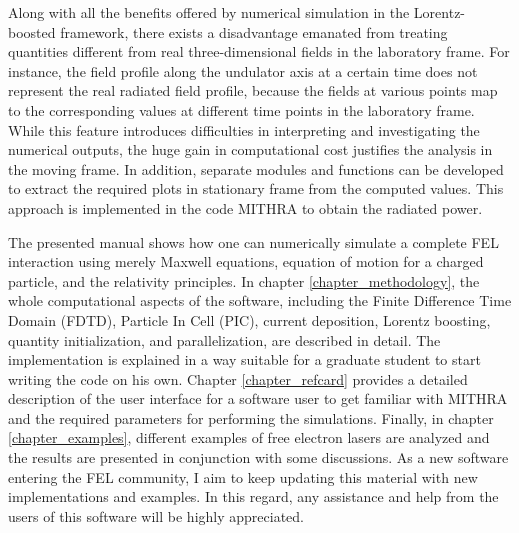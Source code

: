 Along with all the benefits offered by numerical simulation in the Lorentz-boosted framework, there exists a disadvantage emanated from treating quantities different from real three-dimensional fields in the laboratory frame.
%
For instance, the field profile along the undulator axis at a certain time does not represent the real radiated field profile, because the fields at various points map to the corresponding values at different time points in the laboratory frame.
%
While this feature introduces difficulties in interpreting and investigating the numerical outputs, the huge gain in computational cost justifies the analysis in the moving frame.
%
In addition, separate modules and functions can be developed to extract the required plots in stationary frame from the computed values.
%
This approach is implemented in the code MITHRA to obtain the radiated power.

The presented manual shows how one can numerically simulate a complete FEL interaction using merely Maxwell equations, equation of motion for a charged particle, and the relativity principles.
%
In chapter \ref{chapter_methodology}, the whole computational aspects of the software, including the Finite Difference Time Domain (FDTD), Particle In Cell (PIC), current deposition, Lorentz boosting, quantity initialization, and parallelization, are described in detail.
%
The implementation is explained in a way suitable for a graduate student to start writing the code on his own.
%
Chapter \ref{chapter_refcard} provides a detailed description of the user interface for a software user to get familiar with MITHRA and the required parameters for performing the simulations.
%
Finally, in chapter \ref{chapter_examples}, different examples of free electron lasers are analyzed and the results are presented in conjunction with some discussions.
%
As a new software entering the FEL community, I aim to keep updating this material with new implementations and examples.
%
In this regard, any assistance and help from the users of this software will be highly appreciated.
